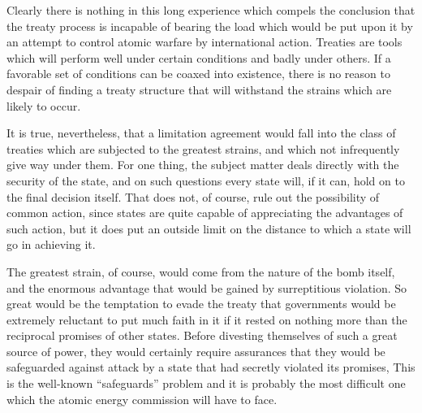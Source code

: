 \begin{introduction}
Clearly there is nothing in this long experience which compels the conclusion that the treaty process is incapable of bearing the load which would be put upon it by an attempt to control atomic warfare by international action. Treaties are tools which will perform well under certain conditions and badly under others. If a favorable set of conditions can be coaxed into existence, there is no reason to despair of finding a treaty structure that will withstand the strains which are likely to occur.

It is true, nevertheless, that a limitation agreement would fall into the class of treaties which are subjected to the greatest strains, and which not infrequently give way under them. For one thing, the subject matter deals directly with the security of the state, and on such questions every state will, if it can, hold on to the final decision itself. That does not, of course, rule out the possibility of common action, since states are quite capable of appreciating the advantages of such action, but it does put an outside limit on the distance to which a state will go in achieving it.

The greatest strain, of course, would come from the nature of the bomb itself, and the enormous advantage that would be gained by surreptitious violation. So great would be the temptation to evade the treaty that governments would be extremely reluctant to put much faith in it if it rested on nothing more than the reciprocal promises of other states. Before divesting themselves of such a great source of power, they would certainly require assurances that they would be safeguarded against attack by a state that had secretly violated its promises, This is the well-known ``safeguards'' problem and it is probably the most difficult one which the atomic energy commission will have to face.


\end{introduction}
